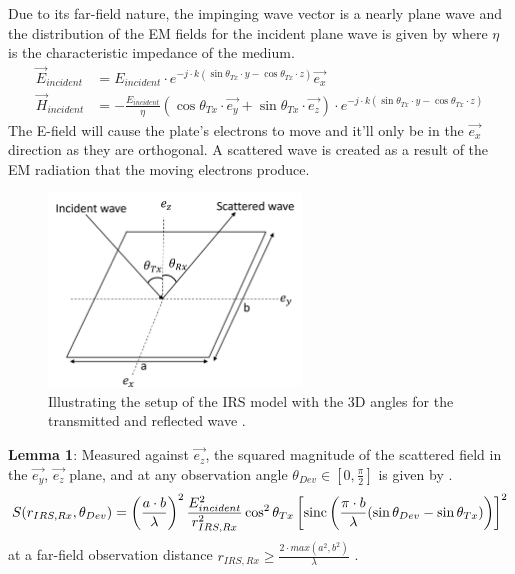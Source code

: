 Due to its far-field nature, the impinging wave vector is a nearly plane wave and the distribution of the \ac{EM} fields for the incident plane wave is given by   where $\eta$ is the characteristic impedance of the medium.
\begin{equation} \label{Eq:model1 EM_inc}
	\begin{aligned}
		\overrightarrow{E}_{incident} &= E_{incident} \cdot e^{-j \cdot k \left( \sin{\theta_{Tx}} \cdot y - \cos{\theta_{Tx}} \cdot z \right) } {\overrightarrow{e_x}} \\
		\overrightarrow{H}_{incident} &= - \frac{E_{incident}}{\eta} \left( \cos{\theta_{Tx}} \cdot {\overrightarrow{e_y}} +\sin{\theta_{Tx}} \cdot {\overrightarrow{e_z}} \right) \cdot e^{-j \cdot k \left( \sin{\theta_{Tx}} \cdot y - \cos{\theta_{Tx}} \cdot z \right)}
	\end{aligned}
\end{equation}
The E-field will cause the plate's electrons to move and it'll only be in the $\overrightarrow{e_x}$ direction as they are orthogonal. A scattered wave is created as a result of the \ac{EM} radiation that the moving electrons produce.
\begin{figure}[H] %
	\centering
	\vspace{12pt} %
	\includegraphics*[width=0.6\textwidth]{images/Section 2 Images/model1}
	\caption{Illustrating the setup of the IRS model with the 3D angles for the transmitted and reflected wave \cite{8936989}.}
	\label{fig:model1} 
\end{figure}

\textbf{Lemma 1}: Measured against $\overrightarrow{e_z}$, the squared magnitude of the scattered field in the $\overrightarrow{e_y}$, $\overrightarrow{e_z}$ plane, and at any observation angle $\theta_{Dev} \in [0, \frac{\pi}{2}]$ is given by .
\begin{equation} \label{Eq:model1 lemma1}
	S(r_{IRS, Rx},\theta_{Dev}) = \left( \frac{a \cdot b}{\lambda} \right)^2 \frac{E_{incident}^2}{r_{IRS, Rx}^2} \cos^2\theta_{Tx} \left[ \operatorname{sinc} \left( \frac{\pi \cdot b}{\lambda}(\sin\theta_{Dev}-\sin\theta_{Tx}) \right) \right]^2
\end{equation}
at a far-field observation distance $r_{IRS, Rx} \geq \frac{2 \cdot max \left( a^2, b^2 \right) }{\lambda}$  \cite{8936989}.

